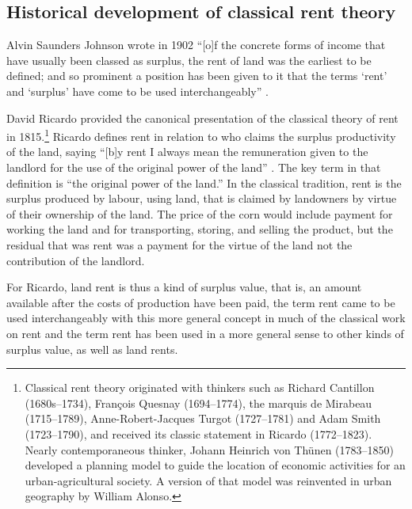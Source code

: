 \subsection{Historical development of classical rent theory}
Alvin Saunders Johnson wrote in 1902 ``[o]f the concrete forms of income that have usually been classed as surplus, the rent of land was the earliest to be defined; and so prominent a position has been given to it that the terms `rent' and `surplus' have come to be used interchangeably'' \cite{johnsonRentModernEconomic1902}. 

David Ricardo provided the canonical presentation of the classical theory of rent \cite{ricardoEssayInfluenceLow1815} in 1815.\footnote{Classical rent theory originated with thinkers such as Richard Cantillon (1680s--1734), Fran\c{c}ois Quesnay (1694--1774), the marquis de Mirabeau (1715--1789), Anne-Robert-Jacques Turgot (1727--1781) and Adam Smith (1723--1790), and received its classic statement in Ricardo (1772--1823). Nearly contemporaneous thinker, Johann Heinrich von Th\"unen (1783--1850) developed a planning model to guide the location of economic activities for an urban-agricultural society. A version of that model was reinvented in urban geography by William Alonso.} 
 Ricardo defines rent in relation to who claims the surplus productivity of the land, %
saying ``[b]y rent I always mean the remuneration given to the landlord for the use of the original power of the land'' \cite{ricardoEssayInfluenceLow1815}. The key term in that definition is ``the original power of the land.'' In the classical tradition, rent is the surplus produced by labour, using land, that is claimed by landowners by virtue of their ownership of the land. The price of the corn would include payment for working the land and for transporting, storing, and selling the product, but the residual that was rent was a payment for the virtue of the land not the contribution of the landlord.

For Ricardo, \gls{land rent} is thus a kind of \gls{surplus value}, that is, an amount available after the costs of production have been paid, the term rent came to be used interchangeably with this more general concept in much of the classical work on rent and the term rent has been used in a more general sense to other kinds of surplus value, as well as land rents.

